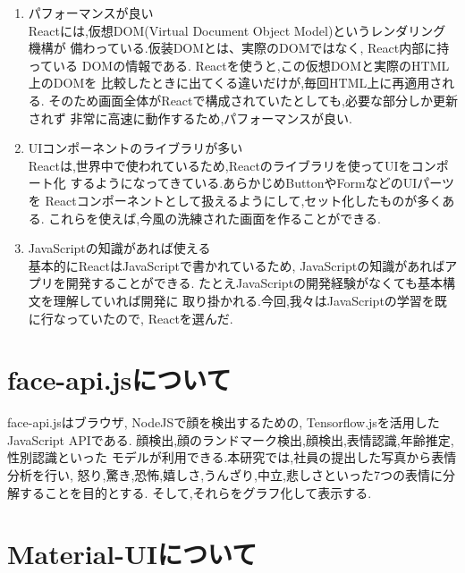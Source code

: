 	\begin{enumerate}
		\item パフォーマンスが良い \\
		Reactには,仮想DOM(Virtual Document Object Model)というレンダリング機構が
		備わっている.仮装DOMとは、実際のDOMではなく, React内部に持っている 
		DOMの情報である. Reactを使うと,この仮想DOMと実際のHTML上のDOMを
		比較したときに出てくる違いだけが,毎回HTML上に再適用される.
		そのため画面全体がReactで構成されていたとしても,必要な部分しか更新されず
		非常に高速に動作するため,パフォーマンスが良い.\\

		\item UIコンポーネントのライブラリが多い \\
		Reactは,世界中で使われているため,Reactのライブラリを使ってUIをコンポート化
		するようになってきている.あらかじめButtonやFormなどのUIパーツを
		Reactコンポーネントとして扱えるようにして,セット化したものが多くある.
		これらを使えば,今風の洗練された画面を作ることができる.\\

		\item JavaScriptの知識があれば使える \\
		基本的にReactはJavaScriptで書かれているため,
		JavaScriptの知識があればアプリを開発することができる.
		たとえJavaScriptの開発経験がなくても基本構文を理解していれば開発に
		取り掛かれる.今回,我々はJavaScriptの学習を既に行なっていたので,
		Reactを選んだ.
	\end{enumerate}
	
\section{face-api.jsについて}
\label{sec:reference_bib}
face-api.jsはブラウザ, NodeJSで顔を検出するための,
Tensorflow.jsを活用したJavaScript APIである.
顔検出,顔のランドマーク検出,顔検出,表情認識,年齢推定,性別認識といった
モデルが利用できる.本研究では,社員の提出した写真から表情分析を行い,
怒り,驚き,恐怖,嬉しさ,うんざり,中立,悲しさといった7つの表情に分解することを目的とする.
そして,それらをグラフ化して表示する.
	
\section{Material-UIについて}
\label{sec:reference_chapter}

